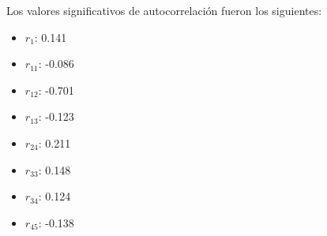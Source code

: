 \documentclass[12pt,letterpaper]{article}   %
\begin{document}
Los valores significativos de autocorrelación fueron los siguientes:
\begin{multicols}{5}
\scriptsize
\begin{itemize}
    \item $r_1$: 0.141
    \item $r_{11}$: -0.086
    \item $r_{12}$: -0.701
    \item $r_{13}$: -0.123
    \item $r_{24}$: 0.211
    \item $r_{33}$: 0.148
    \item $r_{34}$: 0.124
    \item $r_{45}$: -0.138
\end{itemize}
\end{multicols}
\end{document}
